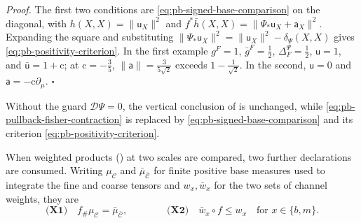 \noindent\emph{Proof.}
The first two conditions are \eqref{eq:pb-signed-base-comparison} on the diagonal, with
\(h(X,X)=\lVert\mathsf u_X\rVert^2\) and \(f^*\bar h(X,X)=\lVert\Psi_*\mathsf u_X+\mathsf a_X\rVert^2\).
Expanding the square and substituting
\(\lVert\Psi_*\mathsf u_X\rVert^2=\lVert\mathsf u_X\rVert^2-\delta_\Psi(X,X)\) gives
\eqref{eq:pb-positivity-criterion}. In the first example \(g^F=1\), \(\bar g^F=\tfrac12\),
\(\Delta_F^\Psi=\tfrac12\), \(\mathsf u=1\), and \(\bar{\mathsf u}=1+\mathrm c\); at
\(\mathrm c=-\tfrac35\), \(\lVert\mathsf a\rVert=\tfrac{3}{5\sqrt2}\) exceeds \(1-\tfrac1{\sqrt2}\).
In the second, \(\mathsf u=0\) and \(\mathsf a=-\mathrm c\partial_\mu\). \hfill$\square$

Without the guard \(\mathcal D\Psi=0\), the vertical conclusion of
 is unchanged, while
\eqref{eq:pb-pullback-fisher-contraction} is replaced by \eqref{eq:pb-signed-base-comparison} and its
criterion \eqref{eq:pb-positivity-criterion}.

When weighted products () at two scales are compared, two
further declarations are consumed. Writing \(\mu_{\mathcal C}\) and \(\bar\mu_{\bar{\mathcal C}}\)
for finite positive base measures used to integrate the fine and coarse tensors and \(w_x,\bar w_x\)
for the two sets of channel weights, they are
\begin{equation}
\textbf{(X1)}\quad f_\#\mu_{\mathcal C}=\bar\mu_{\bar{\mathcal C}},
\qquad\qquad
\textbf{(X2)}\quad \bar w_x\circ f\leq w_x
\quad\text{for }x\in\{b,m\}.
\label{eq:pb-cross-scale-declarations}
\end{equation}

